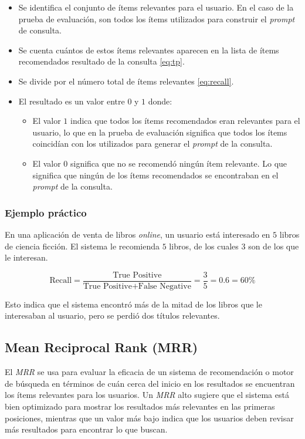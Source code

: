 \documentclass[11pt,a4paper,twoside]{thesis}
\begin{document}
\begin{itemize}
	\item Se identifica el conjunto de ítems relevantes para el usuario. En el caso de la prueba de evaluación, son todos los ítems utilizados para construir el \textit{prompt} de consulta.
	\item Se cuenta cuántos de estos ítems relevantes aparecen en la lista de ítems recomendados resultado de la consulta \ref{eq:tp}.
	\item Se divide por el número total de ítems relevantes \ref{eq:recall}.
	\item El resultado es un valor entre $0$ y $1$ donde:
	      \begin{itemize}
		      \item El valor $1$ indica que todos los ítems recomendados eran relevantes para el usuario, lo que en la prueba de evaluación significa que todos los ítems coincidían con los utilizados para generar el \textit{prompt} de la consulta.
		      \item El valor $0$ significa que no se recomendó ningún ítem relevante. Lo que significa que ningún de los ítems recomendados se encontraban en el \textit{prompt} de la consulta.
	      \end{itemize}
\end{itemize}

\subsubsection{Ejemplo práctico}
En una aplicación de venta de libros \textit{online}, un usuario está interesado en $5$ libros de ciencia ficción. El sistema le recomienda $5$ libros, de los cuales $3$ son de los que le interesan.

\begin{equation}
	\text{Recall} = \frac{\text{True Positive}}{\text{True Positive} + \text{False Negative}} = \frac{3}{5} = 0.6 = 60\%
\end{equation}

Esto indica que el sistema encontró más de la mitad de los libros que le interesaban al usuario, pero se perdió dos títulos relevantes.

\subsection{Mean Reciprocal Rank (MRR)}

El \textit{MRR} se usa para evaluar la eficacia de un sistema de recomendación o motor de búsqueda en términos de cuán cerca del inicio en los resultados se encuentran los ítems relevantes para los usuarios. Un \textit{MRR} alto sugiere que el sistema está bien optimizado para mostrar los resultados más relevantes en las primeras posiciones, mientras que un valor más bajo indica que los usuarios deben revisar más resultados para encontrar lo que buscan.
\end{document}
